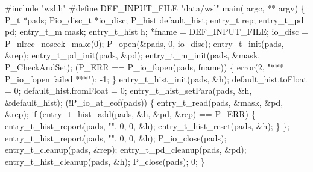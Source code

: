 \begin{centercode}
#include "wsl.h"
#define DEF\_INPUT\_FILE  "data/wsl"
\mbox{}
 main( argc, ** argv) \{
  P\_t                   *pads;
  Pio\_disc\_t           *io\_disc;
  P\_hist                default\_hist;
  entry\_t               rep;
  entry\_t\_pd           pd;
  entry\_t\_m            mask;
  entry\_t\_hist         h;
                *fname = DEF\_INPUT\_FILE;
\mbox{}
  io\_disc = P\_nlrec\_noseek\_make(0);
  P\_open(&pads, 0, io\_disc);
\mbox{}
  entry\_t\_init(pads, &rep);
  entry\_t\_pd\_init(pads, &pd);
  entry\_t\_m\_init(pads, &mask, P\_CheckAndSet);
\mbox{}
   (P\_ERR == P\_io\_fopen(pads, fname)) \{
    error(2, "*** P\_io\_fopen failed ***");
     -1;
  \}
\mbox{}
  entry\_t\_hist\_init(pads, &h);
  default\_hist.toFloat = 0;
  default\_hist.fromFloat = 0;
  entry\_t\_hist\_setPara(pads, &h, &default\_hist);
   (!P\_io\_at\_eof(pads)) \{
    entry\_t\_read(pads, &mask, &pd, &rep);
    if (entry\_t\_hist\_add(pads, &h, &pd, &rep) == P\_ERR) \{
      entry\_t\_hist\_report(pads, "", 0, 0, &h);
      entry\_t\_hist\_reset(pads, &h);
    \}
  \};
  entry\_t\_hist\_report(pads, "", 0, 0, &h);
\mbox{}
  P\_io\_close(pads);
  entry\_t\_cleanup(pads, &rep);
  entry\_t\_pd\_cleanup(pads, &pd);
  entry\_t\_hist\_cleanup(pads, &h);
  P\_close(pads);
   0;
\}
\end{centercode}
